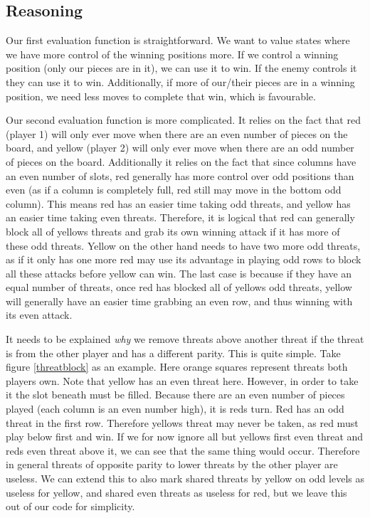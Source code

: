 \documentclass{article}
\begin{document}
\subsection{Reasoning}
\label{ssec:reasoning}
Our first evaluation function is straightforward. We want to value states where we have more control of the winning positions more. If we control a winning position (only our pieces are in it), we can use it to win. If the enemy controls it they can use it to win. Additionally, if more of our/their pieces are in a winning position, we need less moves to complete that win, which is favourable.
		
Our second evaluation function is more complicated. It relies on the fact that red (player 1) will only ever move when there are an even number of pieces on the board, and yellow (player 2) will only ever move when there are an odd number of pieces on the board. Additionally it relies on the fact that since columns have an even number of slots, red generally has more control over odd positions than even (as if a column is completely full, red still may move in the bottom odd column). This means red has an easier time taking odd threats, and yellow has an easier time taking even threats. Therefore, it is logical that red can generally block all of yellows threats and grab its own winning attack if it has more of these odd threats. Yellow on the other hand needs to have two more odd threats, as if it only has one more red may use its advantage in playing odd rows to block all these attacks before yellow can win. The last case is because if they have an equal number of threats, once red has blocked all of yellows odd threats, yellow will generally have an easier time grabbing an even row, and thus winning with its even attack.
		
It needs to be explained \emph{why} we remove threats above another threat if the threat is from the other player and has a different parity. This is quite simple. Take figure \ref{threatblock} as an example. Here orange squares represent threats both players own. Note that yellow has an even threat here. However, in order to take it the slot beneath must be filled. Because there are an even number of pieces played (each column is an even number high), it is reds turn. Red has an odd threat in the first row. Therefore yellows threat may never be taken, as red must play below first and win. If we for now ignore all but yellows first even threat and reds even threat above it, we can see that the same thing would occur. Therefore in general threats of opposite parity to lower threats by the other player are useless. We can extend this to also mark shared threats by yellow on odd levels as useless for yellow, and shared even threats as useless for red, but we leave this out of our code for simplicity.
		
\end{document}
